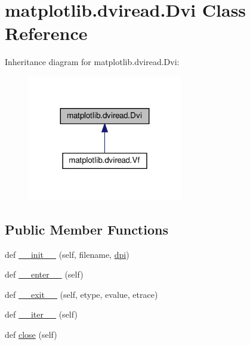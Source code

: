\hypertarget{classmatplotlib_1_1dviread_1_1Dvi}{}\section{matplotlib.\+dviread.\+Dvi Class Reference}
\label{classmatplotlib_1_1dviread_1_1Dvi}


Inheritance diagram for matplotlib.\+dviread.\+Dvi\+:
\nopagebreak
\begin{figure}[H]
\begin{center}
\leavevmode
\includegraphics[width=191pt]{classmatplotlib_1_1dviread_1_1Dvi__inherit__graph}
\end{center}
\end{figure}
\subsection*{Public Member Functions}
\begin{DoxyCompactItemize}
\item 
def \hyperlink{classmatplotlib_1_1dviread_1_1Dvi_a2c99516bd578ef5b8599cbd7e197a292}{\+\_\+\+\_\+init\+\_\+\+\_\+} (self, filename, \hyperlink{classmatplotlib_1_1dviread_1_1Dvi_a4780c17da3c32da700aa7858d29562f6}{dpi})
\item 
def \hyperlink{classmatplotlib_1_1dviread_1_1Dvi_a0f432b7e47c615a03d24c1a9f5f9c7ac}{\+\_\+\+\_\+enter\+\_\+\+\_\+} (self)
\item 
def \hyperlink{classmatplotlib_1_1dviread_1_1Dvi_a8e84e06f5a675f9d0668a993e87cdf4c}{\+\_\+\+\_\+exit\+\_\+\+\_\+} (self, etype, evalue, etrace)
\item 
def \hyperlink{classmatplotlib_1_1dviread_1_1Dvi_a596bdfa8a30ca060cbc945fca1a86722}{\+\_\+\+\_\+iter\+\_\+\+\_\+} (self)
\item 
def \hyperlink{classmatplotlib_1_1dviread_1_1Dvi_a4aba2d0e54333f36e69b83cba14c280f}{close} (self)
\end{DoxyCompactItemize}

